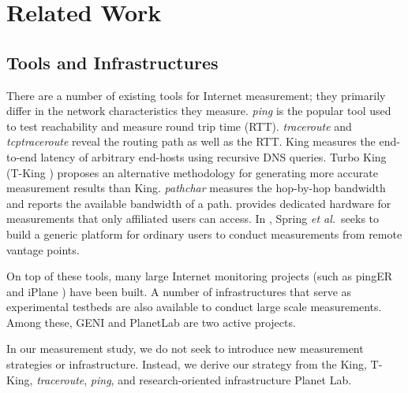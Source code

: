 \section{Related Work}
\label{sec:related-work}


\subsection{Tools and Infrastructures}
\label{sec:tools}

There are a number of existing tools for Internet measurement; they primarily differ in the network characteristics they measure. {\em ping} is the popular tool used to test reachability and measure round trip time (RTT). {\em traceroute} \cite{jacobson1989traceroute} and {\em tcptraceroute} \cite{toren2001tcptraceroute} reveal the routing path as well as the RTT. King \cite{gummadi2002king} measures the end-to-end latency of arbitrary end-hosts using recursive DNS queries. Turbo King (T-King \cite{leonard2008turbo}) proposes an alternative methodology for generating more accurate measurement results than King. {\em pathchar} \cite{jacobson1997pathchar} measures the hop-by-hop bandwidth and \cite{jain2002pathload} reports the available bandwidth of a path. \cite{paxson2002experiences} provides dedicated hardware for measurements that only affiliated users can access. In \cite{spring2003scriptroute}, Spring {\em et al.}\, seeks to build a generic platform for ordinary users to conduct measurements from remote vantage points.

On top of these tools, many large Internet monitoring projects (such as pingER \cite{matthews2000pinger} and iPlane \cite{madhyastha2006iplane}) have been built. A number of infrastructures that serve as experimental testbeds are also available to conduct large scale measurements. Among these, GENI \cite{elliott2008geni} and PlanetLab \cite{chun2003planetlab} are two active projects.


In our measurement study, we do not seek to introduce new measurement strategies or infrastructure. Instead, we derive our strategy from the King, T-King, {\it traceroute}, {\it ping}, and research-oriented infrastructure Planet Lab.

